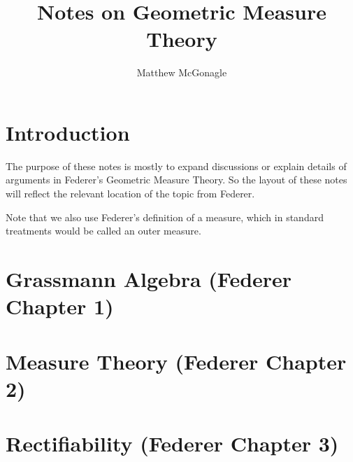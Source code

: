 \documentclass{article}
\begin{document}
\title{Notes on Geometric Measure Theory}
\author{Matthew McGonagle}
\maketitle
\section{Introduction}
The purpose of these notes is mostly to expand discussions or explain details of arguments
in Federer's Geometric Measure Theory. So the layout of these notes will reflect the relevant location
of the topic from Federer.

Note that we also use Federer's definition of a measure, which in standard treatments would be called
an outer measure.

\section{Grassmann Algebra (Federer Chapter 1)}


\section{Measure Theory (Federer Chapter 2)}




\section{Rectifiability (Federer Chapter 3)}


\end{document}
